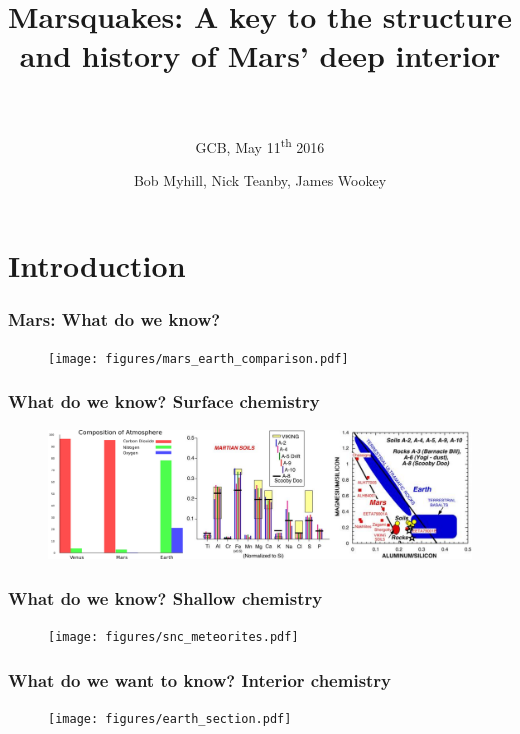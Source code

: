 \documentclass[compress,framenumber]{beamer}
\title{Marsquakes: A key to the structure and history of Mars' deep interior
\\$\,$}
\subtitle{GCB, May 11\textsuperscript{th} 2016}
\author{\hfill{Bob Myhill, Nick Teanby, James Wookey}}
\begin{document}
\begin{frame} 
\titlepage
\vspace{-1.0em}
\end{frame}


\section{Introduction}

\begin{frame}
  \frametitle{Mars: What do we know?}
  \vspace{-2.0em}
  \begin{figure}
    \texttt{[image: figures/mars\_earth\_comparison.pdf]}
  \end{figure}

\end{frame}

\begin{frame}
  \frametitle{What do we know? Surface chemistry}
  \vspace{-2.0em}
  \begin{figure}
    \includegraphics[width=1.00\linewidth]{figures/mars_composition.pdf}
  \end{figure}
\end{frame}

\begin{frame}
  \frametitle{What do we know? Shallow chemistry}
  \vspace{-2.0em}
  \begin{figure}
    \texttt{[image: figures/snc\_meteorites.pdf]}
  \end{figure}
\end{frame}

\begin{frame}
  \frametitle{What do we want to know? Interior chemistry}
  \vspace{-2.0em}
  \begin{figure}
    \texttt{[image: figures/earth\_section.pdf]}
  \end{figure}
\end{frame}
\end{document}
